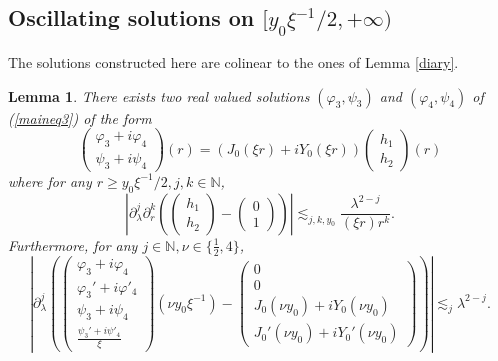 \documentclass[11 pt]{amsart}
\newtheorem{lem}{Lemma}[section]
\theoremstyle{definition}
\theoremstyle{remark}
\numberwithin{equation}{section}
\begin{document}
\subsection{Oscillating solutions on $[y_0\xi^{- 1}/2, + \infty )$}

The solutions constructed here are colinear to the ones of Lemma \ref{diary}.

\begin{lem}
  \label{mana}There exists two real valued solutions $(\varphi_3, \psi_3)$ and
  $(\varphi_4, \psi_4)$ of (\ref{maineq3}) of the form
  \[ \left(\begin{array}{c}
       \varphi_3 + i \varphi_4\\
       \psi_3 + i \psi_4
     \end{array}\right) (r) = (J_0 (\xi r) + i Y_0 (\xi r))
     \left(\begin{array}{c}
       h_1\\
       h_2
     \end{array}\right) (r) \]
  where for any $r \geqslant y_0\xi^{- 1}/2, j, k \in \mathbb{N}$,
  \[ \left| \partial_{\lambda}^j \partial_r^k \left( \left(\begin{array}{c}
       h_1\\
       h_2
     \end{array}\right) - \left(\begin{array}{c}
       0\\
       1
     \end{array}\right) \right) \right| \lesssim_{j, k,y_0} \frac{\lambda^{2 -
     j}}{(\xi r) r^k} . \]
  Furthermore, for any $j \in \mathbb{N}, \nu \in \{ \frac 12, 4 \}$,
  \[ \left| \partial_{\lambda}^j \left( \left(\begin{array}{c}
       \varphi_3 + i \varphi_4\\
       \varphi_3' + i \varphi'_4\\
       \psi_3 + i \psi_4\\
       \frac{\psi_3' + i \psi'_4}{\xi}
     \end{array}\right) (\nu y_0 \xi^{- 1}) - \left(\begin{array}{c}
       0\\
       0\\
       J_0 (\nu y_0) + i Y_0 (\nu y_0)\\
       J_0' (\nu y_0) + i Y_0' (\nu y_0)
     \end{array}\right) \right) \right| \lesssim_j \lambda^{2 - j} . \]
\end{lem}
\end{document}
